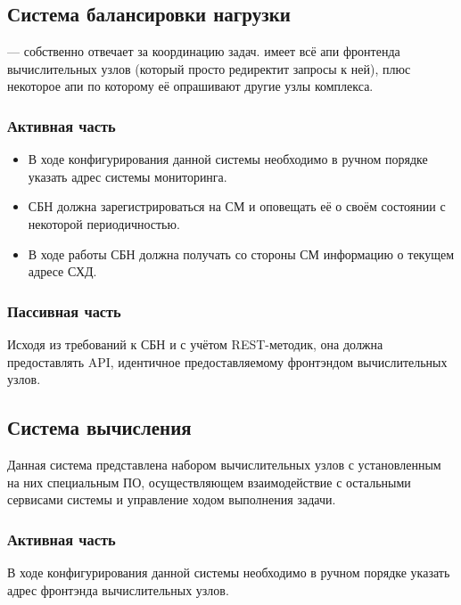 \documentclass[a4paper,12pt]{report}
\numberwithin{equation}{section}
\begin{document}


\subsection{Система балансировки нагрузки}
--- собственно отвечает за координацию задач. имеет всё апи фронтенда вычислительных узлов (который просто редиректит запросы к ней), плюс некоторое апи по которому её опрашивают другие узлы комплекса.

\subsubsection{Активная часть}
\begin{itemize}
  \item В ходе конфигурирования данной системы необходимо в ручном порядке указать адрес системы мониторинга.
  \item СБН должна зарегистрироваться на СМ и оповещать её о своём состоянии с некоторой периодичностью.
  \item В ходе работы СБН должна получать со стороны СМ информацию о текущем адресе СХД.
\end{itemize}

\subsubsection{Пассивная часть}
Исходя из требований к СБН и с учётом REST-методик, она должна предоставлять API, идентичное предоставляемому фронтэндом вычислительных узлов.

\subsection{Система вычисления}
Данная система представлена набором вычислительных узлов с установленным на них специальным ПО, 
осуществляющем взаимодействие с остальными сервисами системы и управление ходом выполнения задачи.

\subsubsection{Активная часть}
В ходе конфигурирования данной системы необходимо в ручном порядке указать адрес фронтэнда вычислительных узлов.
\end{document}
